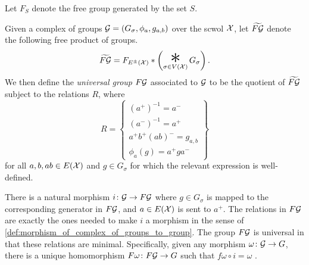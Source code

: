Let $F_S$ denote the free group generated by the set $S$.
\begin{definition}
	Given a complex of groups $\mathcal{G} = (G_\sigma, \phi_a, g_{a,b})$ over the scwol $\mathcal{X}$, let $\widetilde{F\mathcal{G}}$ denote the following free product of groups.
	\[
		\widetilde{F\calg} =  F_{E^\pm(\calx)} \ast \left( \bigast_{\sigma \in V(\calx)} G_\sigma \right)
		.\]
	We then define the \emph{universal group} $F\mathcal{G}$ associated to $\mathcal{G}$ to be the quotient of $\widetilde{F\mathcal{G}}$ subject to the relations  $R$, where
	\[
		R = \left\{
		\begin{array}{l}
			(a^+)^{-1}   = a^-     \\
			(a^-)^{-1}   = a^+     \\
			a^+b^+(ab)^- = g_{a,b} \\
			\phi_a(g)    = a^+ga^-
		\end{array}
		\right\}
	\]
	for all $a,b,ab \in E(\mathcal{X})$ and $g \in G_\sigma$ for which the relevant expression is well-defined.
	\label{def:complex_of_groups_universal_group}
\end{definition}
There is a natural morphism $i \colon \mathcal{G} \to F\mathcal{G}$ where $g \in G_\sigma$ is mapped to the corresponding generator in $F\mathcal{G}$, and  $a \in E(\mathcal{X})$ is sent to $a^+$.
The relations in $F\mathcal{G}$ are exactly the ones needed to make  $i$ a morphism in the sense of \cref{def:morphism_of_complex_of_groups_to_group}.
The group $F\mathcal{G}$ is universal in that these relations are minimal.
Specifically, given any morphism $\omega \colon \mathcal{G} \to G$, there is a unique homomorphism $F\omega \colon F\mathcal{G} \to G$ such that $f\omega \circ i = \omega$ \cite[Chapter 3.\textrm{\ensuremath{\calc}}, Section 3.2]{BrHa11}.

